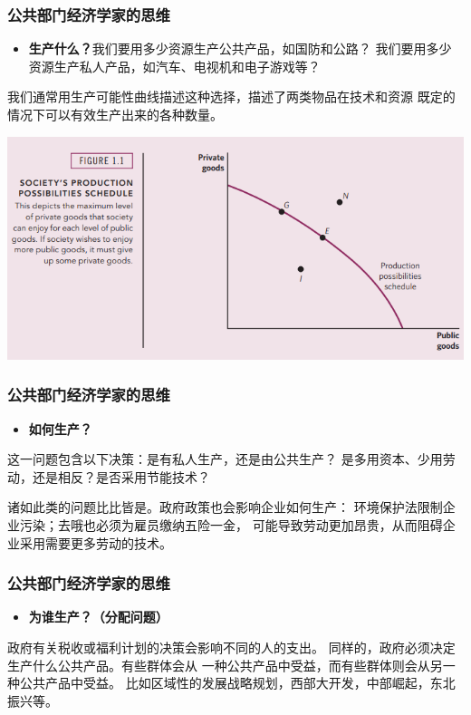 \documentclass[aspectratio=169, 12pt]{beamer}
\begin{document}
\begin{frame}[plain]
    \frametitle{公共部门经济学家的思维}
    \begin{itemize}
        \item \textbf{生产什么？}我们要用多少资源生产公共产品，如国防和公路？
        我们要用多少资源生产私人产品，如汽车、电视机和电子游戏等？
    \end{itemize}
    \begin{minipage}{0.3\textwidth}
        我们通常用生产可能性曲线描述这种选择，描述了两类物品在技术和资源
    既定的情况下可以有效生产出来的各种数量。
    \end{minipage}
    \begin{minipage}{0.65\textwidth}  
        \centering
        \includegraphics[width=1.0\textwidth]{./resources/figure/production.png}
    \end{minipage}
\end{frame}

\begin{frame}[plain]
    \frametitle{公共部门经济学家的思维}
    \begin{itemize}
        \item \textbf{如何生产？}
    \end{itemize}
    这一问题包含以下决策：是有私人生产，还是由公共生产？
    是多用资本、少用劳动，还是相反？是否采用节能技术？
    \par
    诸如此类的问题比比皆是。政府政策也会影响企业如何生产：
    环境保护法限制企业污染；去哦也必须为雇员缴纳五险一金，
    可能导致劳动更加昂贵，从而阻碍企业采用需要更多劳动的技术。
\end{frame}

\begin{frame}[plain]
    \frametitle{公共部门经济学家的思维}
    \begin{itemize}
        \item \textbf{为谁生产？（分配问题）}
    \end{itemize}
    政府有关税收或福利计划的决策会影响不同的人的支出。
    同样的，政府必须决定生产什么公共产品。有些群体会从
    一种公共产品中受益，而有些群体则会从另一种公共产品中受益。
    比如区域性的发展战略规划，西部大开发，中部崛起，东北振兴等。
\end{frame}
\end{document}
